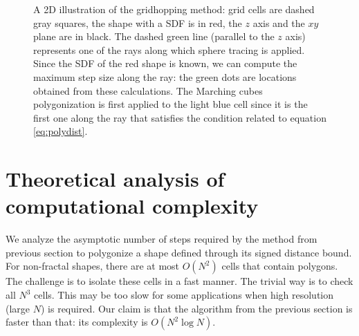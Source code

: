 \documentclass[11pt,twocolumn]{article}
\begin{document}
        \begin{figure}
        \center
        \resizebox{0.7\textwidth}{!}
		{
        }
        \caption
        {
            A 2D illustration of the gridhopping method: grid cells are dashed gray squares, the shape with a SDF is in red, the $z$ axis and the $xy$ plane are in black.
            The dashed green line (parallel to the $z$ axis) represents one of the rays along which sphere tracing is applied.
            Since the SDF of the red shape is known, we can compute the maximum step size along the ray: the green dots are locations obtained from these calculations.
            The Marching cubes polygonization is first applied to the light blue cell since it is the first one along the ray that satisfies the condition related to equation \ref{eq:polydist}.
        }
        \label{visualsummary}
        \end{figure}

	\section{Theoretical analysis of computational complexity}\label{sec:complexity}
		We analyze the asymptotic number of steps required by the method from previous section to polygonize a shape defined through its signed distance bound.
		For non-fractal shapes, there are at most $O(N^2)$ cells that contain polygons.
		The challenge is to isolate these cells in a fast manner.
		The trivial way is to check all $N^3$ cells.
		This may be too slow for some applications when high resolution (large $N$) is required.
		Our claim is that the algorithm from the previous section is faster than that:
		its complexity is $O(N^2\log N)$.
\end{document}
